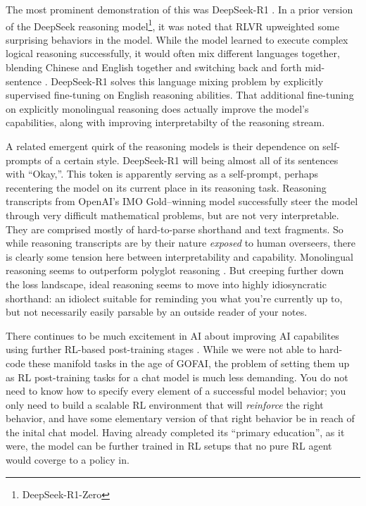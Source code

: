 The most prominent demonstration of this was DeepSeek-R1
\cite{deepseekai2025deepseek}. In a prior version of the DeepSeek reasoning
model\footnote{DeepSeek-R1-Zero}, it was noted that RLVR upweighted some
surprising behaviors in the model. While the model learned to execute complex
logical reasoning successfully, it would often mix different languages
together, blending Chinese and English together and switching back and forth
mid-sentence \cite{deepseekai2025deepseek}. DeepSeek-R1 solves this language
mixing problem by explicitly supervised fine-tuning on English reasoning
abilities. That additional fine-tuning on explicitly monolingual reasoning does
actually improve the model's capabilities, along with improving interpretabilty
of the reasoning stream.

A related emergent quirk of the reasoning models is their dependence on
self-prompts of a certain style. DeepSeek-R1 will being almost all of its
sentences with ``Okay,''. This token is apparently serving as a self-prompt,
perhaps recentering the model on its current place in its reasoning task.
Reasoning transcripts from OpenAI's IMO Gold--winning model successfully steer
the model through very difficult mathematical problems, but are not very
interpretable. They are comprised mostly of hard-to-parse shorthand and text
fragments. So while reasoning transcripts are by their nature \emph{exposed} to
human overseers, there is clearly some tension here between interpretability
and capability. Monolingual reasoning seems to outperform polyglot reasoning
\cite{}. But creeping further down the loss landscape, ideal reasoning seems to
move into highly idiosyncratic shorthand: an idiolect suitable for reminding
you what you're currently up to, but not necessarily easily parsable by an
outside reader of your notes.

There continues to be much excitement in AI about improving AI capabilites
using further RL-based post-training stages \cite{silver2025experience}. While
we were not able to hard-code these manifold tasks in the age of GOFAI, the
problem of setting them up as RL post-training tasks for a chat model is much
less demanding. You do not need to know how to specify every element of a
successful model behavior; you only need to build a scalable RL environment
that will \emph{reinforce} the right behavior, and have some elementary version
of that right behavior be in reach of the inital chat model. Having already
completed its ``primary education'', as it were, the model can be further
trained in RL setups that no pure RL agent would coverge to a policy in.

